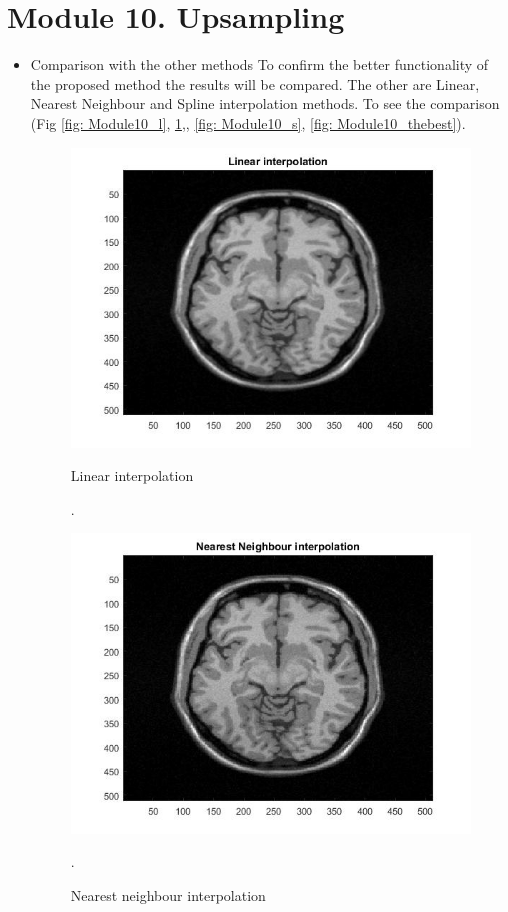 \section{Module 10. Upsampling}


\begin{itemize}

\item Comparison with the other methods
\newline To confirm the better functionality of the proposed method the results will be compared. The other are Linear, Nearest Neighbour and Spline interpolation methods. To see the comparison (Fig \ref{fig: Module10_l}, \ref{fig: Module10_NN},, \ref{fig: Module10_s}, \ref{fig: Module10_thebest}).

\begin{figure}[H]
\centering
\begin{minipage}{.5\textwidth}
  \centering
  \includegraphics[width=.7\linewidth]{figures/Module_10/Module_10_l}
 \caption{Linear interpolation}. 
\label{fig: Module10_l}
\end{minipage}%
\begin{minipage}{.5\textwidth}
  \centering
  \includegraphics[width=.7\linewidth]{figures/Module_10/Module_10_NN}\caption{Nearest neighbour interpolation}. 
\label{fig: Module10_NN}
\end{minipage}


\end{figure}
\end{itemize}
